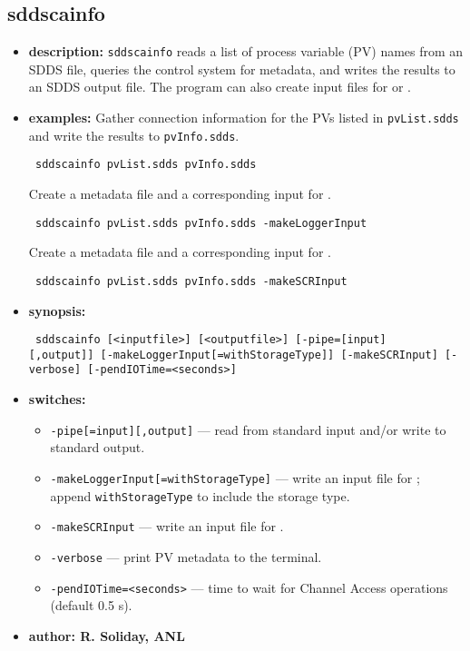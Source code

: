%
%
\begin{latexonly}
\newpage
\end{latexonly}

\subsection{sddscainfo}
\label{sddscainfo}

\begin{itemize}
\item {\bf description:}
  \verb+sddscainfo+ reads a list of process variable (PV) names from an SDDS file,
  queries the control system for metadata, and writes the results to an SDDS output file.
  The program can also create input files for  or .

\item {\bf examples:}
  Gather connection information for the PVs listed in \verb+pvList.sdds+ and write the results to \verb+pvInfo.sdds+.
  \begin{flushleft}{\tt
sddscainfo pvList.sdds pvInfo.sdds
  }\end{flushleft}
  Create a metadata file and a corresponding input for .
  \begin{flushleft}{\tt
sddscainfo pvList.sdds pvInfo.sdds -makeLoggerInput
  }\end{flushleft}
  Create a metadata file and a corresponding input for .
  \begin{flushleft}{\tt
sddscainfo pvList.sdds pvInfo.sdds -makeSCRInput
  }\end{flushleft}

\item {\bf synopsis:}
  \begin{flushleft}{\tt
sddscainfo [<inputfile>] [<outputfile>]\
[-pipe=[input][,output]]\
[-makeLoggerInput[=withStorageType]]\
[-makeSCRInput]\
[-verbose]\
[-pendIOTime=<seconds>]
  }\end{flushleft}

\item {\bf switches:}
  \begin{itemize}
  \item {\tt -pipe[=input][,output]} --- read from standard input and/or write to standard output.
  \item {\tt -makeLoggerInput[=withStorageType]} --- write an input file for ; append \verb|withStorageType| to include the storage type.
  \item {\tt -makeSCRInput} --- write an input file for .
  \item {\tt -verbose} --- print PV metadata to the terminal.
  \item {\tt -pendIOTime=<seconds>} --- time to wait for Channel Access operations (default 0.5 s).
  \end{itemize}

\item {\bf author: R. Soliday, ANL}
\end{itemize}
